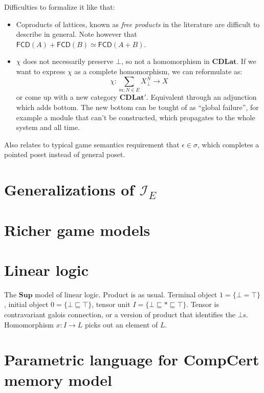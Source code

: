 \documentclass[draft,11pt]{report}
\theoremstyle{definition}
\newcommand{\kw}[1]{\ensuremath{ \mathsf{#1} }}
\newcommand{\refby}{\sqsubseteq} %
\begin{document}
Difficulties to formalize it like that:
\begin{itemize}
  \item Coproducts of lattices,
    known as \emph{free products} in the literature
    \citep{...}
    are difficult to describe in general.
    Note however that
    $\kw{FCD}(A) + \kw{FCD}(B) \simeq \kw{FCD}(A + B)$.
  \item $\chi$ does not necessarily preserve $\bot$,
    so not a homomorphism in $\mathbf{CDLat}$.
    If we want to express $\chi$ as a complete homomorphism,
    we can reformulate as:
    \[
      \chi : \sum_{m:N \in E} X^N_\bot \rightarrow X
    \]
    or come up with a new category $\mathbf{CDLat}'$.
    Equivalent through an adjunction which adds bottom.
    The new bottom can be tought of as ``global failure'',
    for example a module that can't be constructed,
    which propagates to the whole system and all time.
\end{itemize}
Also relates to typical game semantics requirement
that $\epsilon \in \sigma$,
which completes a pointed poset instead of general poset.

\section{Generalizations of $\mathcal{I}_E$}

\section{Richer game models}

\section{Linear logic}

The $\mathbf{Sup}$ model of linear logic.
Product is as usual.
Terminal object $1 = \{\bot = \top\}$,
initial object $0 = \{\bot \refby \top\}$,
tensor unit $I = \{\bot \refby * \refby \top\}$.
Tensor is contravariant galois connection,
or a version of product that identifies the $\bot$s.
Homomorphism $x : I \rightarrow L$
picks out an element of $L$.

\section{Parametric language for CompCert memory model}





%



\end{document}
